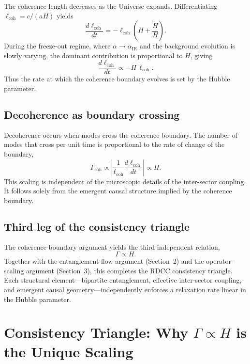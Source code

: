 \documentclass[11pt,a4paper]{article}
\begin{document}
The coherence length decreases as the Universe expands. Differentiating
$\ell_{\mathrm{coh}} = c/(aH)$ yields
\begin{equation}
    \frac{d\ell_{\mathrm{coh}}}{dt}
    = -\ell_{\mathrm{coh}} \left( H + \frac{\dot{H}}{H} \right).
\end{equation}
During the freeze-out regime, where $\alpha \to \alpha_{\mathrm{IR}}$ and the background
evolution is slowly varying, the dominant contribution is proportional to $H$, giving
\begin{equation}
    \frac{d\ell_{\mathrm{coh}}}{dt} \propto -H\, \ell_{\mathrm{coh}}.
\end{equation}
Thus the rate at which the coherence boundary evolves is set by the Hubble parameter.

\subsection{Decoherence as boundary crossing}

Decoherence occurs when modes cross the coherence boundary. The number of modes
that cross per unit time is proportional to the rate of change of the boundary,
\begin{equation}
    \Gamma_{\mathrm{coh}}
    \propto \left| \frac{1}{\ell_{\mathrm{coh}}}
    \frac{d\ell_{\mathrm{coh}}}{dt} \right|
    \propto H.
\end{equation}
This scaling is independent of the microscopic details of the inter-sector coupling. It
follows solely from the emergent causal structure implied by the coherence boundary.

\subsection{Third leg of the consistency triangle}

The coherence-boundary argument yields the third independent relation,
\begin{equation}
    \Gamma \propto H.
\end{equation}
Together with the entanglement-flow argument (Section~2) and the operator-scaling
argument (Section~3), this completes the RDCC consistency triangle. Each structural
element—bipartite entanglement, effective inter-sector coupling, and emergent causal
geometry—independently enforces a relaxation rate linear in the Hubble parameter.

\section{Consistency Triangle: Why \texorpdfstring{$\Gamma \propto H$}{Γ ∝ H} is the Unique Scaling}
\end{document}
